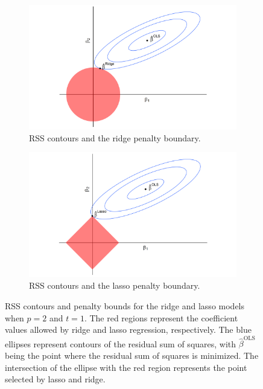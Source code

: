 \documentclass{article}
\begin{document}
\begin{figure}[!h]
	\centering
	\begin{subfigure}[b]{0.45\textwidth}
		\caption{RSS contours and the ridge penalty boundary.}
		\label{fig:ridge-diagram}
		\includegraphics[width=\textwidth]{images/ridge-diagram.png}
	\end{subfigure}
	\hspace{30pt}
	\begin{subfigure}[b]{0.45\textwidth}
		\caption{RSS contours and the lasso penalty boundary.}
		\label{fig:lasso-diagram}
		\includegraphics[width=\textwidth]{images/lasso-diagram.png}
	\end{subfigure}
	\captionsetup{width = 5in}
	\caption{RSS contours and penalty bounds for the ridge and lasso models when $p=2$ and $t = 1$. The red regions represent the coefficient values allowed by ridge and lasso regression, respectively. The blue ellipses represent contours of the residual sum of squares, with $\hat{\beta}^{\text{OLS}}$ being the point where the residual sum of squares is minimized. The intersection of the ellipse with the red region represents the point selected by lasso and ridge.}
	\label{fig:ridge-lasso-diagram}
\end{figure}
\end{document}
